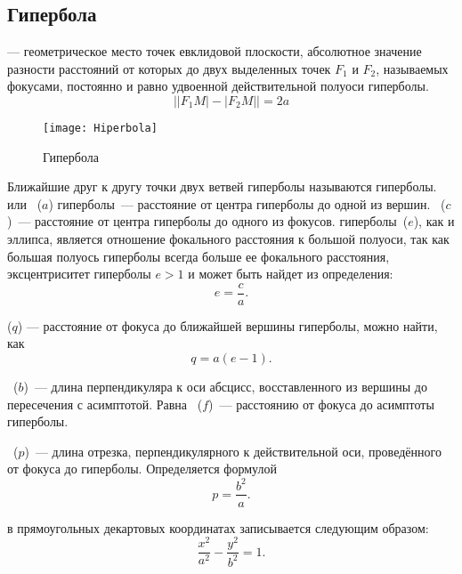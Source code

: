 \subsection{Гипербола}
 
{\bfseries {}} --- геометрическое место точек евклидовой плоскости, абсолютное значение разности расстояний от которых до двух выделенных точек $F_1$ и $F_2$, называемых фокусами, постоянно и равно удвоенной действительной полуоси гиперболы.
\begin{equation}
\bigl||F_1M|-|F_2M|\bigr| = 2a
\end{equation}

\begin{wrapfigure}[15]{r}{0.5\tw}
	\centering
	\texttt{[image: Hiperbola]}
	\caption{Гипербола \label{pic:the-pic}}
\end{wrapfigure}
Ближайшие друг к другу точки двух ветвей гиперболы называются  гиперболы.  или ~($a$) гиперболы~--- расстояние от центра гиперболы до одной из вершин. ~($c$)~---  расстояние от центра гиперболы до одного из фокусов.  гиперболы~($e$), как и  эллипса, является отношение фокального расстояния к большой полуоси, так как большая полуось гиперболы всегда больше ее фокального расстояния, эксцентриситет гиперболы $e > 1$ и может быть найдет из определения:
\begin{equation}
e=\frac{c}{a}.
\end{equation}

 ($q$) --- расстояние от фокуса до ближайшей вершины гиперболы, можно найти, как
\begin{equation}
q = a ( e - 1).
\end{equation}

~($b$)~--- длина перпендикуляра к оси абсцисс, восставленного из вершины до пересечения с асимптотой. Равна ~($f$)~--- расстоянию от фокуса до асимптоты гиперболы.

~($p$)~--- длина отрезка, перпендикулярного к действительной оси, проведённого от фокуса до гиперболы. Определяется формулой
\begin{equation}
p=\frac{b^2}{a}.
\end{equation}

 в прямоугольных декартовых координатах записывается следующим образом:\begin{equation}
\frac{x^2}{a^2}-\frac{y^2}{b^2}=1.
\end{equation}

